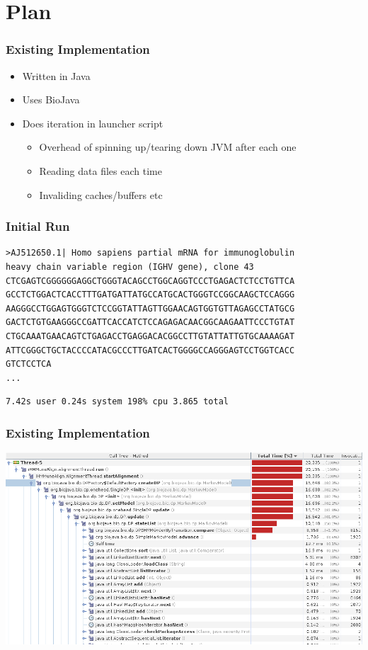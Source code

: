 \documentclass{beamer}
\begin{document}
\section{Plan}

\begin{frame}
\frametitle{Existing Implementation}
\begin{itemize}
 \item Written in Java
 \item Uses BioJava
 \item Does iteration in launcher script
 \begin{itemize}
  \item Overhead of spinning up/tearing down JVM after each one
  \item Reading data files each time
  \item Invaliding caches/buffers etc
 \end{itemize}
\end{itemize}
\end{frame}

\begin{frame}[fragile]
\frametitle{Initial Run}
\begin{verbatim}
>AJ512650.1| Homo sapiens partial mRNA for immunoglobulin
heavy chain variable region (IGHV gene), clone 43
CTCGAGTCGGGGGGAGGCTGGGTACAGCCTGGCAGGTCCCTGAGACTCTCCTGTTCA
GCCTCTGGACTCACCTTTGATGATTATGCCATGCACTGGGTCCGGCAAGCTCCAGGG
AAGGGCCTGGAGTGGGTCTCCGGTATTAGTTGGAACAGTGGTGTTAGAGCCTATGCG
GACTCTGTGAAGGGCCGATTCACCATCTCCAGAGACAACGGCAAGAATTCCCTGTAT
CTGCAAATGAACAGTCTGAGACCTGAGGACACGGCCTTGTATTATTGTGCAAAAGAT
ATTCGGGCTGCTACCCCATACGCCCTTGATCACTGGGGCCAGGGAGTCCTGGTCACC
GTCTCCTCA
...
\end{verbatim}
\begin{verbatim}
7.42s user 0.24s system 198% cpu 3.865 total
\end{verbatim}
\end{frame}

\begin{frame}
\frametitle{Existing Implementation}
\includegraphics[width=\textwidth]{profile.png}
\end{frame}

\end{document}
